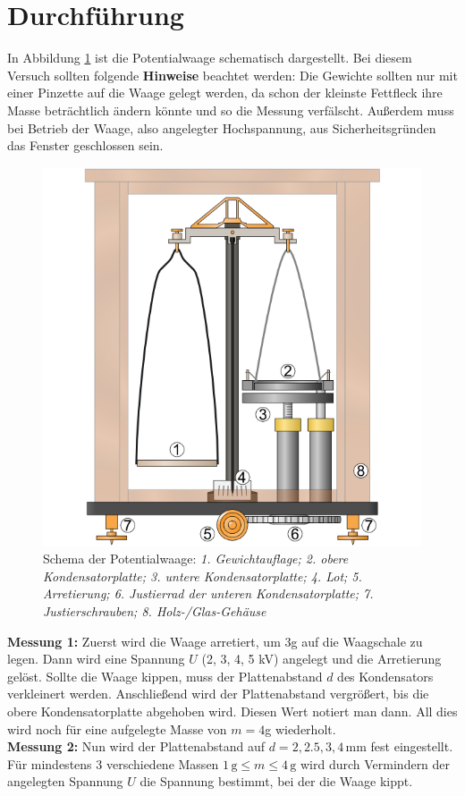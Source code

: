 \documentclass[12pt,a4paper,titlepage,headinclude,bibtotoc]{scrartcl}
\begin{document}
\section{Durchführung}
\label{sec:durchfuehrung}
In Abbildung \ref{fig:PotWaageSchema} ist die Potentialwaage schematisch dargestellt.
Bei diesem Versuch sollten folgende \textbf{Hinweise} beachtet werden:
Die Gewichte sollten nur mit einer Pinzette auf die Waage gelegt werden, da schon der kleinste Fettfleck ihre Masse beträchtlich ändern könnte und so die Messung verfälscht.
Außerdem muss bei Betrieb der Waage, also angelegter Hochspannung, aus Sicherheitsgründen das Fenster geschlossen sein.\\
\begin{figure}[!htb]
	\centering	
	\includegraphics[scale=0.7]{PotWaageSchema.png}
	\caption{Schema der Potentialwaage: \small{\emph{1. Gewichtauflage; 2. obere Kondensatorplatte; 3. untere Kondensatorplatte; 4. Lot; 5. Arretierung; 6. Justierrad der unteren Kondensatorplatte; 7. Justierschrauben; 8. Holz-/Glas-Gehäuse}}\protect\footnotemark}
	\label{fig:PotWaageSchema}
\end{figure}



\textbf{Messung 1:}
Zuerst wird die Waage arretiert, um 3g auf die Waagschale zu legen.
Dann wird eine Spannung $U$ (2, 3, 4, 5 kV) angelegt und die Arretierung gelöst.
Sollte die Waage kippen, muss der Plattenabstand $d$ des Kondensators verkleinert werden.
Anschließend wird der Plattenabstand vergrößert, bis die obere Kondensatorplatte abgehoben wird.
Diesen Wert notiert man dann.
All dies wird noch für eine aufgelegte Masse von $m=4$g wiederholt.\\  
\textbf{Messung 2:}
Nun wird der Plattenabstand auf $d=2, 2.5, 3, 4\,$mm fest eingestellt.
Für mindestens 3 verschiedene Massen $1\,\text{g}\leq m \leq 4\,\text{g}$ wird durch Vermindern der angelegten Spannung $U$ die Spannung bestimmt, bei der die Waage kippt.
\end{document}
